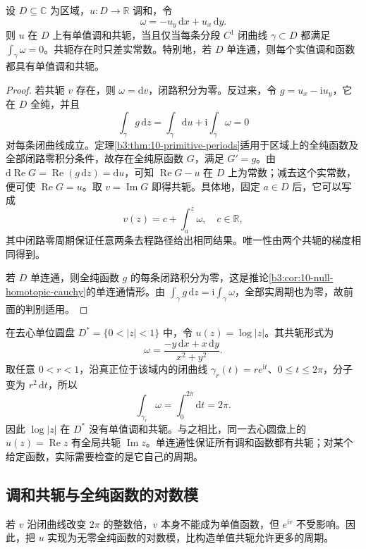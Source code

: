 \begin{theorem}\label{b3:thm:15-global-conjugate}
设 \(D\subseteq\mathbb C\) 为区域，\(u:D\to\mathbb R\) 调和，令
\[
 \omega=-u_y\,\mathrm dx+u_x\,\mathrm dy.
\]
则 \(u\) 在 \(D\) 上有单值调和共轭，当且仅当每条分段 \(C^1\) 闭曲线 \(\gamma\subset D\) 都满足 \(\int_\gamma\omega=0\)。共轭存在时只差实常数。特别地，若 \(D\) 单连通，则每个实值调和函数都具有单值调和共轭。
\end{theorem}
\begin{proof}
若共轭 \(v\) 存在，则 \(\omega=\mathrm dv\)，闭路积分为零。反过来，令 \(g=u_x-\mathrm i u_y\)，它在 \(D\) 全纯，并且
\[
 \int_\gamma g\,\mathrm dz
 =\int_\gamma\mathrm du+\mathrm i\int_\gamma\omega=0
\]
对每条闭曲线成立。定理\ref{b3:thm:10-primitive-periods}适用于区域上的全纯函数及全部闭路零积分条件，故存在全纯原函数 \(G\)，满足 \(G'=g\)。由
\(\mathrm d\operatorname{Re}G=\operatorname{Re}(g\,\mathrm dz)=\mathrm du\)，可知 \(\operatorname{Re}G-u\) 在 \(D\) 上为常数；减去这个实常数，便可使 \(\operatorname{Re}G=u\)。取 \(v=\operatorname{Im}G\) 即得共轭。具体地，固定 \(a\in D\) 后，它可以写成
\[
 v(z)=c+\int_a^z\omega,
 \quad c\in\mathbb R,
\]
其中闭路零周期保证任意两条去程路径给出相同结果。唯一性由两个共轭的梯度相同得到。

若 \(D\) 单连通，则全纯函数 \(g\) 的每条闭路积分为零，这是推论\ref{b3:cor:10-null-homotopic-cauchy}的单连通情形。由 \(\int_\gamma g\,\mathrm dz=\mathrm i\int_\gamma\omega\)，全部实周期也为零，故前面的判别适用。
\end{proof}

在去心单位圆盘 \(D^*=\{0<|z|<1\}\) 中，令 \(u(z)=\log|z|\)。其共轭形式为
\[
 \omega=\frac{-y\,\mathrm dx+x\,\mathrm dy}{x^2+y^2}.
\]
取任意 \(0<r<1\)，沿真正位于该域内的闭曲线 \(\gamma_r(t)=re^{\mathrm i t}\)、\(0\le t\le2\pi\)，分子变为 \(r^2\,\mathrm dt\)，所以
\[
 \int_{\gamma_r}\omega=\int_0^{2\pi}\mathrm dt=2\pi.
\]
因此 \(\log|z|\) 在 \(D^*\) 没有单值调和共轭。与之相比，同一去心圆盘上的 \(u(z)=\operatorname{Re}z\) 有全局共轭 \(\operatorname{Im}z\)。单连通性保证所有调和函数都有共轭；对某个给定函数，实际需要检查的是它自己的周期。

\subsection{调和共轭与全纯函数的对数模}
\label{b3:subsec:150204}

若 \(v\) 沿闭曲线改变 \(2\pi\) 的整数倍，\(v\) 本身不能成为单值函数，但 \(e^{\mathrm i v}\) 不受影响。因此，把 \(u\) 实现为无零全纯函数的对数模，比构造单值共轭允许更多的周期。

